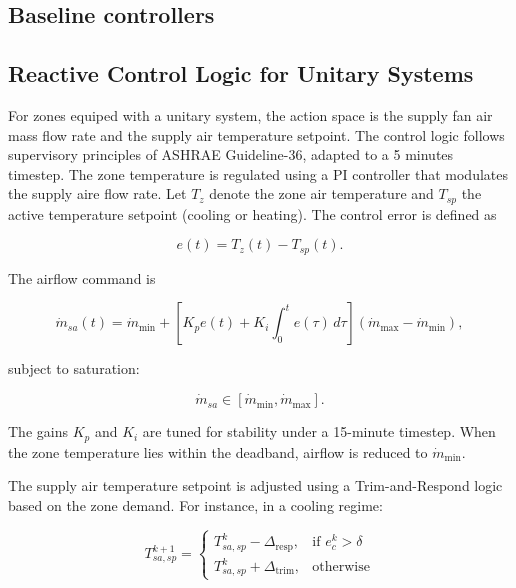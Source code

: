 \documentclass[10pt]{article} %
\begin{document}
\begin{itemize}
\section{Baseline controllers}
\label{apdx:baseline_controllers}

\subsection{Reactive Control Logic for Unitary Systems}
\label{apdx:reactive_control_logic_unitray}

 For zones equiped with a unitary system, the action space is the supply fan air mass flow rate and the supply air temperature setpoint. The control logic follows supervisory principles of ASHRAE Guideline-36, adapted to a 5 minutes timestep. The zone temperature is regulated using a PI controller that modulates the supply aire flow rate. Let $T_z$ denote the zone air temperature and $T_{sp}$ the active temperature setpoint (cooling or heating). The control error is defined as

    \begin{equation}
    e(t) = T_z(t) - T_{sp}(t).
    \end{equation}
    
    The airflow command is
    
    \begin{equation}
    \dot m_{sa}(t) =
    \dot m_{\min}
    + \left[
    K_p e(t) +
    K_i \int_{0}^{t} e(\tau)\, d\tau
    \right]
    \left(\dot m_{\max} - \dot m_{\min}\right),
    \end{equation}
    
    subject to saturation:
    
    \begin{equation}
    \dot m_{sa} \in [\dot m_{\min}, \dot m_{\max}].
    \end{equation}
    
    The gains $K_p$ and $K_i$ are tuned for stability under a 15-minute timestep.
    When the zone temperature lies within the deadband, airflow is reduced to
    $\dot m_{\min}$.

    The supply air temperature setpoint is adjusted using a Trim-and-Respond logic based on the zone demand. For instance, in a cooling regime:

    \begin{equation}
    T_{sa,sp}^{k+1} =
    \begin{cases}
    T_{sa,sp}^{k} - \Delta_{\text{resp}}, & \text{if } e_c^k > \delta \\
    T_{sa,sp}^{k} + \Delta_{\text{trim}}, & \text{otherwise}
    \end{cases}
    \end{equation}


\end{itemize}
\end{document}
